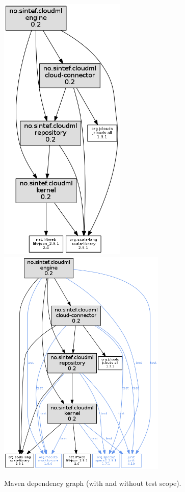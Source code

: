 \begin{figure}[tb]
  \includegraphics[width=6cm]{img/dependency-graph-1.png}
  \includegraphics[width=8cm]{img/dependency-graph-2.png}
  \caption{Maven dependency graph (with and without test scope).}
  \label{fig:dependendy-graph}
\end{figure}
